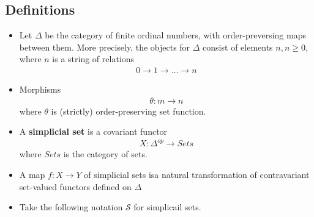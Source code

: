 \documentclass[Total.tex]{subfiles}
\begin{document}
			\subsection{Definitions}
			\begin{Def}
				\begin{itemize}
					\item Let $\Delta$ be the category of finite ordinal numbers, with order-preversing maps between them. More precisely, the objects for $\Delta$ consist of elements $n,n\geq 0$, where $n$ is a string of relations
					\begin{gather*}
						0\rightarrow 1\rightarrow\dots\rightarrow n
					\end{gather*} 
					\item Morphisms
					\begin{gather*}
						\theta:m\rightarrow n
					\end{gather*}
					where $\theta$ is (strictly) order-preserving set function.
					
				\end{itemize}
			\end{Def}
			
			\begin{Def}
				\begin{itemize}
					\item  A \textbf{simplicial set} is a covariant functor
					\begin{gather*}
						X:\Delta^{op}\rightarrow Sets
					\end{gather*}
					where $Sets$ is the category of sets.
					\item A map $f:X\rightarrow Y$ of simplicial sets isa natural transformation of contravariant set-valued functors defined on $\Delta$
					\begin{center}
					\end{center}
					\item Take the following notation $\mathcal{S}$ for simplicail sets.
				\end{itemize}
			\end{Def}
		
\end{document}
